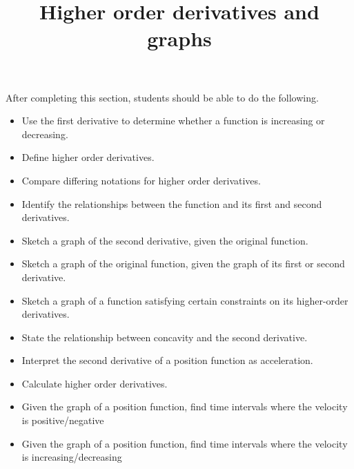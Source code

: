 \documentclass{ximera}
\title{Higher order derivatives and graphs}
\begin{document}
\begin{abstract}
\end{abstract}

\maketitle

\begin{sectionOutcomes}

After completing this section, students should be able to do the following.


\begin{itemize}
\item Use the first derivative to determine whether a function is increasing or decreasing.
\item Define higher order derivatives.
\item Compare differing notations for higher order derivatives.
\item Identify the relationships between the function and its first and second derivatives.
\item Sketch a graph of the second derivative, given the original function.
\item Sketch a graph of the original function, given the graph of its first or second derivative.
\item Sketch a graph of a function satisfying certain constraints on its higher-order derivatives.
\item State the relationship between concavity and the second derivative.
\item Interpret the second derivative of a position function as acceleration.
\item Calculate higher order derivatives.
\item Given the graph of a position function, find time intervals where the velocity is positive/negative
\item Given the graph of a position function, find time intervals where the velocity is increasing/decreasing


\end{itemize}
\end{sectionOutcomes}
\end{document}

